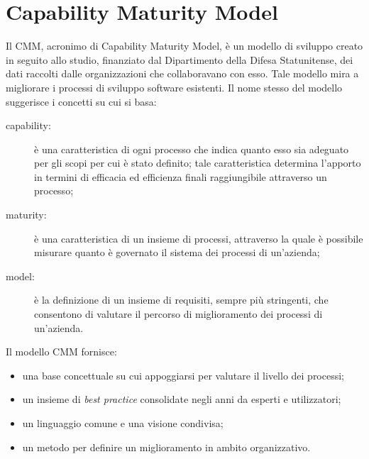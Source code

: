\section{Capability Maturity Model}
	Il CMM, acronimo di Capability Maturity Model, è un modello di sviluppo creato in seguito allo studio, finanziato dal  Dipartimento della Difesa Statunitense, dei dati raccolti dalle organizzazioni che collaboravano con esso. Tale modello mira a migliorare i processi di sviluppo software esistenti.
	Il nome stesso del modello suggerisce i concetti su cui si basa:
	\begin{description}
		\item[capability:] è una caratteristica di ogni processo che indica quanto esso sia adeguato per gli scopi per cui è stato definito; tale caratteristica determina l'apporto in termini di efficacia ed efficienza finali raggiungibile attraverso un processo;
		\item[maturity:] è una caratteristica di un insieme di processi, attraverso la quale è possibile misurare quanto è governato il sistema dei processi di un'azienda;
		\item[model:] è la definizione di un insieme di requisiti, sempre più stringenti, che consentono di valutare il percorso di miglioramento dei processi di un'azienda.
	\end{description}
	Il modello CMM fornisce:
	\begin{itemize} 
		\item una base concettuale su cui appoggiarsi per valutare il livello dei processi;
		\item un insieme di \textit{best practice} consolidate negli anni da esperti e utilizzatori;
		\item un linguaggio comune e una visione condivisa;
		\item un metodo per definire un miglioramento in ambito organizzativo.
	\end{itemize}
